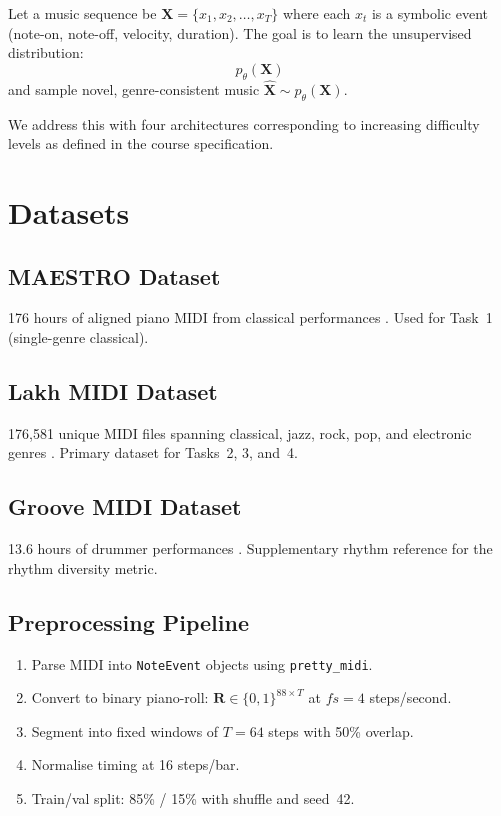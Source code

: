 \documentclass[conference]{IEEEtran}
\begin{document}
Let a music sequence be $\mathbf{X} = \{x_1, x_2, \ldots, x_T\}$
where each $x_t$ is a symbolic event (note-on, note-off, velocity,
duration). The goal is to learn the unsupervised distribution:
\begin{equation}
p_\theta(\mathbf{X})
\end{equation}
and sample novel, genre-consistent music $\hat{\mathbf{X}} \sim
p_\theta(\mathbf{X})$.

We address this with four architectures corresponding to increasing
difficulty levels as defined in the course specification.

\section{Datasets}

\subsection{MAESTRO Dataset}
176 hours of aligned piano MIDI from classical performances
\cite{maestro2018}. Used for Task~1 (single-genre classical).

\subsection{Lakh MIDI Dataset}
176,581 unique MIDI files spanning classical, jazz, rock, pop, and
electronic genres \cite{raffel2016lakh}. Primary dataset for
Tasks~2, 3, and~4.

\subsection{Groove MIDI Dataset}
13.6 hours of drummer performances \cite{groove2019}. Supplementary
rhythm reference for the rhythm diversity metric.

\subsection{Preprocessing Pipeline}
\begin{enumerate}
\item Parse MIDI into \texttt{NoteEvent} objects using
      \texttt{pretty\_midi}.
\item Convert to binary piano-roll: $\mathbf{R} \in \{0,1\}^{88
      \times T}$ at $fs=4$ steps/second.
\item Segment into fixed windows of $T=64$ steps with 50\% overlap.
\item Normalise timing at 16 steps/bar.
\item Train/val split: 85\% / 15\% with shuffle and seed~42.
\end{enumerate}
\end{document}
